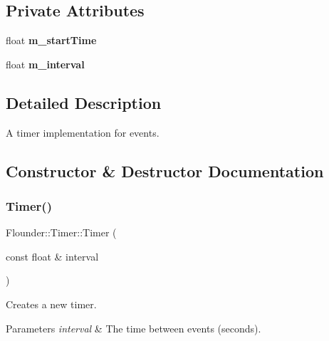 \subsection*{Private Attributes}
\begin{DoxyCompactItemize}
\item 
\mbox{\label{class_flounder_1_1_timer_a11f6cf1f896036f9b687cd1560865109}} 
float {\bfseries m\+\_\+start\+Time}
\item 
\mbox{\label{class_flounder_1_1_timer_aec6b229172baaa34c27676512136cebc}} 
float {\bfseries m\+\_\+interval}
\end{DoxyCompactItemize}


\subsection{Detailed Description}
A timer implementation for events. 



\subsection{Constructor \& Destructor Documentation}
\mbox{\label{class_flounder_1_1_timer_ab21eb1887372627b81f36cbfa1d021ac}} 
\subsubsection{\texorpdfstring{Timer()}{Timer()}}
{\footnotesize\ttfamily Flounder\+::\+Timer\+::\+Timer (\begin{DoxyParamCaption}\item[{const float \&}]{interval }\end{DoxyParamCaption})}



Creates a new timer. 


\begin{DoxyParams}{Parameters}
{\em interval} & The time between events (seconds). \\
\hline
\end{DoxyParams}
\mbox{\label{class_flounder_1_1_timer_a0c54e5bb581591dce3a6f4d2c13e3ca3}} 
